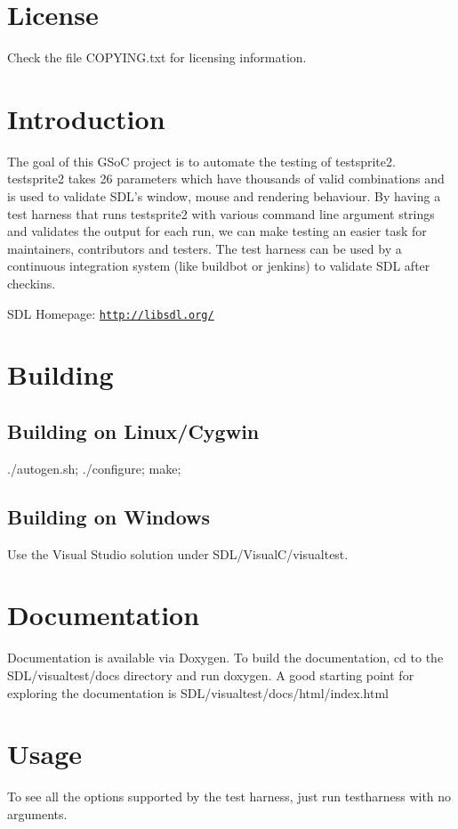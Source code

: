 \hypertarget{index_license_sec}{}\section{License}\label{index_license_sec}
Check the file {\ttfamily C\-O\-P\-Y\-I\-N\-G.\-txt} for licensing information.\hypertarget{index_intro_sec}{}\section{Introduction}\label{index_intro_sec}
The goal of this G\-So\-C project is to automate the testing of testsprite2. testsprite2 takes 26 parameters which have thousands of valid combinations and is used to validate S\-D\-L's window, mouse and rendering behaviour. By having a test harness that runs testsprite2 with various command line argument strings and validates the output for each run, we can make testing an easier task for maintainers, contributors and testers. The test harness can be used by a continuous integration system (like buildbot or jenkins) to validate S\-D\-L after checkins.

S\-D\-L Homepage\-: \href{http://libsdl.org/}{\tt http\-://libsdl.\-org/}\hypertarget{index_build_sec}{}\section{Building}\label{index_build_sec}
\hypertarget{index_build_linux}{}\subsection{Building on Linux/\-Cygwin}\label{index_build_linux}
{\ttfamily ./autogen.sh; ./configure; make;}\hypertarget{index_build_windows}{}\subsection{Building on Windows}\label{index_build_windows}
Use the Visual Studio solution under {\ttfamily S\-D\-L/\-Visual\-C/visualtest}.\hypertarget{index_docs_sec}{}\section{Documentation}\label{index_docs_sec}
Documentation is available via Doxygen. To build the documentation, cd to the S\-D\-L/visualtest/docs directory and run {\ttfamily doxygen}. A good starting point for exploring the documentation is {\ttfamily S\-D\-L/visualtest/docs/html/index.\-html} \hypertarget{index_usage_sec}{}\section{Usage}\label{index_usage_sec}
To see all the options supported by the test harness, just run {\ttfamily testharness} with no arguments.

